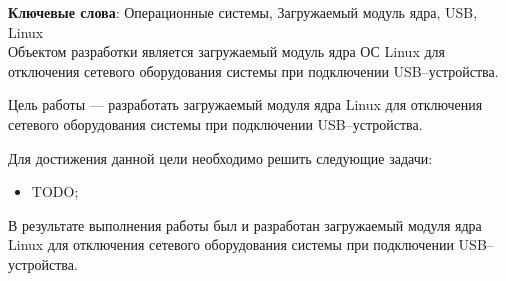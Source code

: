 \begin{essay}{}
    \noindent\textbf{Ключевые слова}: Операционные системы, Загружаемый модуль ядра, USB, Linux\\

    Объектом разработки является загружаемый модуль ядра ОС Linux для отключения сетевого оборудования системы при подключении USB--устройства.

    Цель работы --- разработать загружаемый модуля ядра Linux для отключения сетевого оборудования системы при подключении USB--устройства.

    Для достижения данной цели необходимо решить следующие задачи:

    \begin{itemize}
        \item TODO;
    \end{itemize}

    В результате выполнения работы был и разработан загружаемый модуля ядра Linux для отключения сетевого оборудования системы при подключении USB--устройства.
\end{essay}
